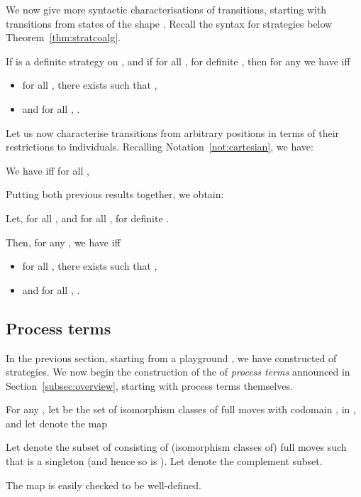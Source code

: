 \documentclass{LMCS}
\theoremstyle{plain}\newtheorem{satz}[thm]{Satz}
\begin{document}
We now give more syntactic characterisations of transitions, starting 
with transitions from states of the shape .
Recall the syntax for strategies below Theorem~\ref{thm:stratcoalg}.
\begin{prop}
  If  is a definite strategy on , and if for all ,  for definite , then for any  we have  iff
  \begin{itemize}
  \item for all , there exists  such that ,
  \item and for
    all , .
  \end{itemize}
\end{prop}
Let us now characterise transitions from arbitrary positions in terms
of their restrictions to individuals.  Recalling
Notation~\ref{not:cartesian}, we have:
\begin{prop}\label{prop:localtrans}
  We have  iff for all , 
  
\end{prop}

Putting both previous results together, we obtain:
\begin{cor}
  Let, for all ,   and for all ,  for definite .

  Then, for any , we have  iff
  \begin{itemize}
  \item for all , there exists  such that ,
  \item and for
    all , .
  \end{itemize}
\end{cor}

\subsection{Process terms}\label{sec:syn}
In the previous section, starting from a playground , we have
constructed \anlts{}  of strategies. We now begin the
construction of the \lts{}  of \emph{process terms} announced
in Section~\ref{subsec:overview}, starting with process terms themselves.

\begin{defi}\label{defn:MMM}
  For any , let  be the set of isomorphism classes of full
  moves with codomain , in , and let  denote the map
  

  Let  denote the subset of  consisting of
  (isomorphism classes of) full moves  such that
   is a singleton (and hence so is ).  Let
   denote the complement subset.
\end{defi}
The map  is easily checked to be well-defined.
\end{document}
